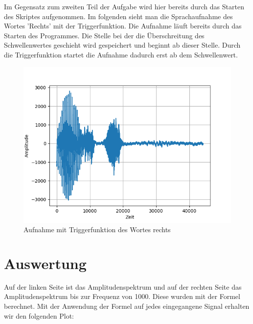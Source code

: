 \documentclass[12pt, oneside, a4paper, \docLanguage]{report}
\begin{document}
\newline
Im Gegensatz zum zweiten Teil der Aufgabe wird hier bereits durch das Starten des Skriptes aufgenommen.
\newpage
Im folgenden sieht man die Sprachaufnahme des Wortes 'Rechts' mit der Triggerfunktion.
Die Aufnahme läuft bereits durch das Starten des Programmes.
\newline
Die Stelle bei der die Überschreitung des Schwellenwertes geschieht wird gespeichert und beginnt ab dieser Stelle.
\newline
Durch die Triggerfunktion startet die Aufnahme dadurch erst ab dem Schwellenwert.
\begin{figure}[H]
	\centering
	\includegraphics[width=.75\linewidth]{../data/img/rechtsamp.png}
	\caption{Aufnahme mit Triggerfunktion des Wortes rechts}
	\label{img:Aufnahme mit Triggerfunktion des Wortes rechts}
\end{figure}

\newpage
\section{Auswertung}
\label{chap:VERSUCH_1_AUSWERTUNG}
Auf der linken Seite ist das Amplitudenspektrum und auf der rechten Seite das Amplitudenspektrum bis zur Frequenz von 1000.
\newline
Diese wurden mit der Formel berechnet. Mit der Anwendung der Formel auf jedes eingegangene Signal erhalten wir den folgenden Plot:
\end{document}
